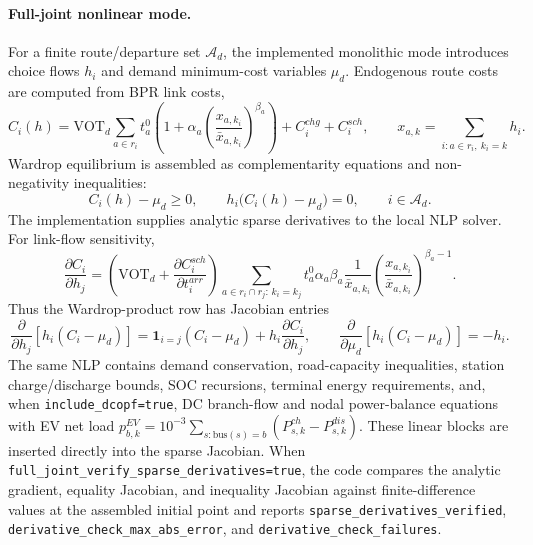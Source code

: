 \paragraph{Full-joint nonlinear mode.}
For a finite route/departure set $\mathcal{A}_d$, the implemented monolithic
mode introduces choice flows $h_i$ and demand minimum-cost variables $\mu_d$.
Endogenous route costs are computed from BPR link costs,
\begin{equation}
  C_i(h)=\mathrm{VOT}_d\sum_{a\in r_i}
  t^0_a\left(1+\alpha_a\left(\frac{x_{a,k_i}}{\bar{x}_{a,k_i}}\right)^{\beta_a}\right)
  + C^{chg}_i + C^{sch}_i,
  \qquad
  x_{a,k}=\sum_{i:a\in r_i,\ k_i=k} h_i .
\end{equation}
Wardrop equilibrium is assembled as complementarity equations and
non-negativity inequalities:
\begin{equation}
  C_i(h)-\mu_d \ge 0,\qquad
  h_i\bigl(C_i(h)-\mu_d\bigr)=0,
  \qquad i\in\mathcal{A}_d .
\end{equation}
The implementation supplies analytic sparse derivatives to the local NLP
solver.  For link-flow sensitivity,
\begin{equation}
  \frac{\partial C_i}{\partial h_j}
  =
  \left(\mathrm{VOT}_d+\frac{\partial C^{sch}_i}{\partial t^{arr}_i}\right)
  \sum_{a\in r_i\cap r_j:\,k_i=k_j}
  t^0_a\alpha_a\beta_a
  \frac{1}{\bar{x}_{a,k_i}}
  \left(\frac{x_{a,k_i}}{\bar{x}_{a,k_i}}\right)^{\beta_a-1}.
\end{equation}
Thus the Wardrop-product row has Jacobian entries
\begin{equation}
  \frac{\partial}{\partial h_j}
  \left[h_i(C_i-\mu_d)\right]
  =
  \mathbf{1}_{i=j}(C_i-\mu_d)
  + h_i\frac{\partial C_i}{\partial h_j},
  \qquad
  \frac{\partial}{\partial \mu_d}
  \left[h_i(C_i-\mu_d)\right] = -h_i .
\end{equation}
The same NLP contains demand conservation, road-capacity inequalities,
station charge/discharge bounds, SOC recursions, terminal energy requirements,
and, when \texttt{include\_dcopf=true}, DC branch-flow and nodal power-balance
equations with EV net load
$p^{EV}_{b,k}=10^{-3}\sum_{s:\mathrm{bus}(s)=b}(P^{ch}_{s,k}-P^{dis}_{s,k})$.
These linear blocks are inserted directly into the sparse Jacobian.  When
\texttt{full\_joint\_verify\_sparse\_derivatives=true}, the code compares the
analytic gradient, equality Jacobian, and inequality Jacobian against
finite-difference values at the assembled initial point and reports
\texttt{sparse\_derivatives\_verified},
\texttt{derivative\_check\_max\_abs\_error}, and
\texttt{derivative\_check\_failures}.

